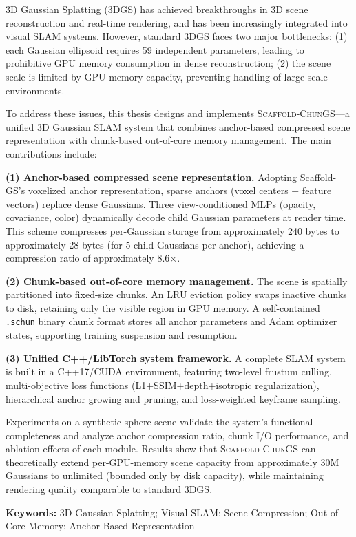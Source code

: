 \documentclass[zihao=-4,twoside,openright,fontset=none]{ctexbook}
\numberwithin{figure}{chapter}
\numberwithin{table}{chapter}
\numberwithin{equation}{chapter}
\newcommand{\ScaffoldChunGS}{\textsc{Scaffold-ChunGS}\xspace}
\newcommand{\schun}{\texttt{.schun}\xspace}
\begin{document}
3D Gaussian Splatting (3DGS) has achieved breakthroughs in 3D scene reconstruction and real-time rendering, and has been increasingly integrated into visual SLAM systems. However, standard 3DGS faces two major bottlenecks: (1) each Gaussian ellipsoid requires 59 independent parameters, leading to prohibitive GPU memory consumption in dense reconstruction; (2) the scene scale is limited by GPU memory capacity, preventing handling of large-scale environments.

To address these issues, this thesis designs and implements \ScaffoldChunGS—a unified 3D Gaussian SLAM system that combines anchor-based compressed scene representation with chunk-based out-of-core memory management. The main contributions include:

\textbf{(1) Anchor-based compressed scene representation.} Adopting Scaffold-GS's voxelized anchor representation, sparse anchors (voxel centers + feature vectors) replace dense Gaussians. Three view-conditioned MLPs (opacity, covariance, color) dynamically decode child Gaussian parameters at render time. This scheme compresses per-Gaussian storage from approximately 240 bytes to approximately 28 bytes (for 5 child Gaussians per anchor), achieving a compression ratio of approximately 8.6$\times$.

\textbf{(2) Chunk-based out-of-core memory management.} The scene is spatially partitioned into fixed-size chunks. An LRU eviction policy swaps inactive chunks to disk, retaining only the visible region in GPU memory. A self-contained \schun binary chunk format stores all anchor parameters and Adam optimizer states, supporting training suspension and resumption.

\textbf{(3) Unified C++/LibTorch system framework.} A complete SLAM system is built in a C++17/CUDA environment, featuring two-level frustum culling, multi-objective loss functions (L1+SSIM+depth+isotropic regularization), hierarchical anchor growing and pruning, and loss-weighted keyframe sampling.

Experiments on a synthetic sphere scene validate the system's functional completeness and analyze anchor compression ratio, chunk I/O performance, and ablation effects of each module. Results show that \ScaffoldChunGS can theoretically extend per-GPU-memory scene capacity from approximately 30M Gaussians to unlimited (bounded only by disk capacity), while maintaining rendering quality comparable to standard 3DGS.

\vspace{1em}
\noindent\textbf{Keywords:} 3D Gaussian Splatting; Visual SLAM; Scene Compression; Out-of-Core Memory; Anchor-Based Representation

\clearpage
{}
\setcounter{page}{1}






\end{document}

